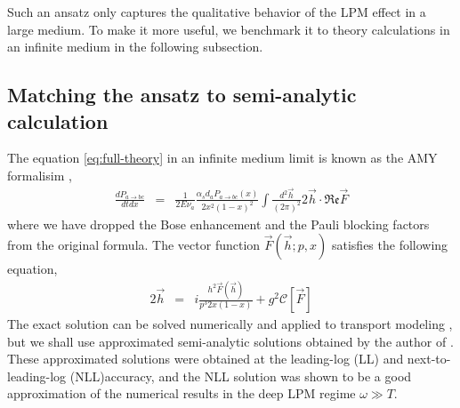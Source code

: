 \documentclass[aps, prc, reprint, amsmath, groupedaddress, nofootinbib]{revtex4-1}
\begin{document}
Such an ansatz only captures the qualitative behavior of the LPM effect in a large medium. 
To make it more useful, we benchmark it to theory calculations in an infinite medium in the following subsection.

\subsection{Matching the ansatz to semi-analytic calculation}
The equation \ref{eq:full-theory} in an infinite medium limit is known as the AMY formalisim \cite{Arnold:2002ja,Arnold:2002zm,Arnold:2003zc},
\begin{eqnarray}\label{eq:AMY-1}
\nonumber
\frac{dP_{a\rightarrow bc}}{dt dx} &=& \frac{1}{2E\nu_a} \frac{\alpha_s d_a P_{a\rightarrow bc}(x)}{2x^2(1-x)^2}\int\frac{d^2\vec{h}}{(2\pi)^2}2\vec{h}\cdot \mathfrak{Re} \vec{F}
\end{eqnarray}
where we have dropped the Bose enhancement and the Pauli blocking factors from the original formula.
The vector function $\vec{F}(\vec{h}; p, x)$ satisfies the following equation,
\begin{eqnarray}\label{eq:AMY-2}
\nonumber
2\vec{h} &=& i\frac{h^2 \vec{F}(\vec{h})}{p^3 2x(1-x)} + g^2 \mathcal{C}[\vec{F}]
\end{eqnarray} 
The exact solution can be solved numerically and applied to transport modeling \cite{Jeon:2003gi,Schenke:2009gb}, but we shall use approximated semi-analytic solutions obtained by the author of \cite{Arnold:2008zu}.
These approximated solutions were obtained at the leading-log (LL) and next-to-leading-log (NLL)accuracy, and the NLL solution was shown to be a good approximation of the numerical results in the deep LPM regime $\omega \gg T$.
\end{document}
